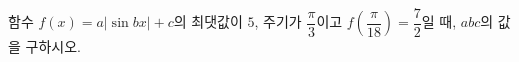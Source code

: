 함수 $f(x)=a|\sin bx|+c$의 최댓값이 $5$, 주기가 $\dfrac{\pi}{3}$이고 $f\!\left(\dfrac{\pi}{18}\right)=\dfrac{7}{2}$일 때, $abc$의 값을 구하시오. 
